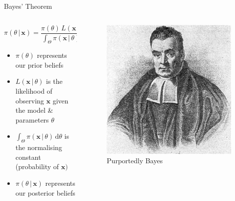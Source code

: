 \documentclass[aspectratio=169]{beamer}
\begin{document}
\begin{frame}{Bayes' Theorem}
  \begin{columns}
    \begin{column}{0.6\textwidth}
      \vspace{1em}
      \begin{equation*}
        \pi(\theta \,|\,\bm{x}) = \frac{\pi(\theta)\,L(\bm{x}\,|\,\theta)}{\int_{\Theta} \pi(\bm{x}\,|\,\theta)\, \text{d}\theta}
      \end{equation*}
      \begin{itemize}
        \setlength\itemsep{1em}
        \item $\pi(\theta)$ represents our \alert{prior} beliefs
        \item $L(\bm{x}\,|\,\theta)$ is the likelihood of observing $\bm{x}$ given the model \& parameters $\theta$
        \item $\int_{\Theta} \pi(\bm{x}\,|\,\theta)\, \text{d}\theta$ is the normalising constant (probability of $\bm{x})$
        \item $\pi(\theta \, | \, \bm{x})$ represents our \alert{posterior} beliefs
      \end{itemize}
    \end{column}
    \begin{column}{0.4\textwidth}
      \begin{figure}
        \includegraphics[width=\textwidth]{baes.jpg}
        \caption{Purportedly Bayes}
      \end{figure}
    \end{column}
  \end{columns}
\end{frame}
\end{document}
